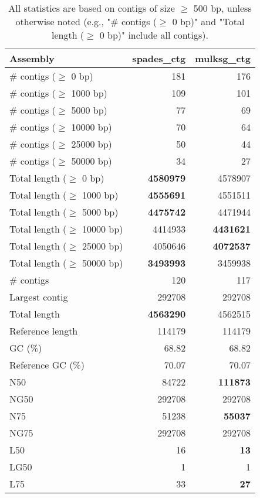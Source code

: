\documentclass[12pt,a4paper]{article}
\begin{document}
\begin{table}[ht]
\begin{center}
\caption{All statistics are based on contigs of size $\geq$ 500 bp, unless otherwise noted (e.g., "\# contigs ($\geq$ 0 bp)" and "Total length ($\geq$ 0 bp)" include all contigs).}
\begin{tabular}{|l*{2}{|r}|}
\hline
Assembly & spades\_ctg & mulksg\_ctg \\ \hline
\# contigs ($\geq$ 0 bp) & 181 & 176 \\ \hline
\# contigs ($\geq$ 1000 bp) & 109 & 101 \\ \hline
\# contigs ($\geq$ 5000 bp) & 77 & 69 \\ \hline
\# contigs ($\geq$ 10000 bp) & 70 & 64 \\ \hline
\# contigs ($\geq$ 25000 bp) & 50 & 44 \\ \hline
\# contigs ($\geq$ 50000 bp) & 34 & 27 \\ \hline
Total length ($\geq$ 0 bp) & {\bf 4580979} & 4578907 \\ \hline
Total length ($\geq$ 1000 bp) & {\bf 4555691} & 4551511 \\ \hline
Total length ($\geq$ 5000 bp) & {\bf 4475742} & 4471944 \\ \hline
Total length ($\geq$ 10000 bp) & 4414933 & {\bf 4431621} \\ \hline
Total length ($\geq$ 25000 bp) & 4050646 & {\bf 4072537} \\ \hline
Total length ($\geq$ 50000 bp) & {\bf 3493993} & 3459938 \\ \hline
\# contigs & 120 & 117 \\ \hline
Largest contig & 292708 & 292708 \\ \hline
Total length & {\bf 4563290} & 4562515 \\ \hline
Reference length & 114179 & 114179 \\ \hline
GC (\%) & 68.82 & 68.82 \\ \hline
Reference GC (\%) & 70.07 & 70.07 \\ \hline
N50 & 84722 & {\bf 111873} \\ \hline
NG50 & 292708 & 292708 \\ \hline
N75 & 51238 & {\bf 55037} \\ \hline
NG75 & 292708 & 292708 \\ \hline
L50 & 16 & {\bf 13} \\ \hline
LG50 & 1 & 1 \\ \hline
L75 & 33 & {\bf 27} \\ \hline

\end{tabular}
\end{center}
\end{table}
\end{document}
